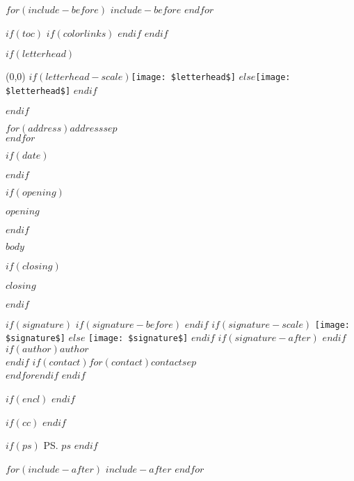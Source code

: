 \documentclass[$if(font-size)$$fontsize$$else$10pt$endif$]{letter}
\begin{document}
	$for(include-before)$
	$include-before$
	$endfor$

	$if(toc)$
	{
	$if(colorlinks)$
	\hypersetup{linkcolor=$if(toccolor)$$toccolor$$else$black$endif$}
	$endif$
	\setcounter{tocdepth}{$toc-depth$}
	\tableofcontents
	}
	$endif$

	$if(letterhead)$
	\begin{textblock}{0}(0,0)
		$if(letterhead-scale)$\texttt{[image: \$letterhead\$]}
		$else$\texttt{[image: \$letterhead\$]}
		$endif$
	\end{textblock}
	$endif$

\begin{letter}{$for(address)$$address$$sep$\\$endfor$}

	$if(date)$
		\date{$date$}
	$endif$

	$if(opening)$
		\opening{$opening$}
	$endif$

	$body$

	$if(closing)$
		\closing{$closing$}
	$endif$

	$if(signature)$
		$if(signature-before)$
			\vspace*{$signature-before$}
		$endif$
		$if(signature-scale)$
			\texttt{[image: \$signature\$]}
		$else$
			\texttt{[image: \$signature\$]}
		$endif$
		$if(signature-after)$
			\vspace*{$signature-after$}
		$endif$
		$if(author)$$author$\\$endif$
		$if(contact)$$for(contact)$$contact$$sep$\\$endfor$$endif$
	$endif$

	$if(encl)$
	$endif$

	$if(cc)$
	$endif$

	$if(ps)$
		\ps{$ps$}
	$endif$

\end{letter}

$for(include-after)$
$include-after$
$endfor$
\end{document}
